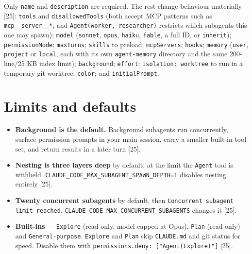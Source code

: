 \documentclass[11pt,a4paper,twoside,openany]{book}
\begin{document}
Only \texttt{name} and \texttt{description} are required. The rest change behaviour materially [25]: \texttt{tools} and \texttt{disallowed\allowbreak{}Tools} (both accept MCP patterns such as \texttt{mcp\_\allowbreak{}\_\allowbreak{}server\_\allowbreak{}\_\allowbreak{}*}, and \texttt{Agent(worke\allowbreak{}r,\allowbreak{} researcher\allowbreak{})} restricts which subagents this one may spawn); \texttt{model} (\texttt{sonnet}, \texttt{opus}, \texttt{haiku}, \texttt{fable}, a full ID, or \texttt{inherit}); \texttt{permission\allowbreak{}Mode}; \texttt{max\allowbreak{}Turns}; \texttt{skills} to preload; \texttt{mcp\allowbreak{}Servers}; \texttt{hooks}; \texttt{memory} (\texttt{user}, \texttt{project} or \texttt{local}, each with its own \texttt{agent-\allowbreak{}memory} directory and the same 200-line/25 KB index limit); \texttt{background}; \texttt{effort}; \texttt{isolation:\allowbreak{} worktree} to run in a temporary git worktree; \texttt{color}; and \texttt{initial\allowbreak{}Prompt}.


\FloatBarrier
\setcounter{section}{4}
\section{Limits and defaults}

\begin{itemize}
\item \textbf{Background is the default.} Background subagents run concurrently, surface permission prompts in your main session, carry a smaller built-in tool set, and return results in a later turn [25].
\item \textbf{Nesting is three layers deep} by default; at the limit the \texttt{Agent} tool is withheld. \texttt{CLAUDE\_\allowbreak{}CODE\_\allowbreak{}MAX\_\allowbreak{}SUBAGENT\_\allowbreak{}SPAWN\_\allowbreak{}DEPTH=\allowbreak{}1} disables nesting entirely [25].
\item \textbf{Twenty concurrent subagents} by default, then \texttt{Concurrent \allowbreak{}subagent li\allowbreak{}mit reached}. \texttt{CLAUDE\_\allowbreak{}CODE\_\allowbreak{}MAX\_\allowbreak{}CONCURRENT\_\allowbreak{}SUBAGENTS} changes it [25].
\item \textbf{Built-ins} — \texttt{Explore} (read-only, model capped at Opus), \texttt{Plan} (read-only) and \texttt{General-\allowbreak{}purpose}. \texttt{Explore} and \texttt{Plan} skip \texttt{CLAUDE.\allowbreak{}md} and git status for speed. Disable them with \texttt{permissions.\allowbreak{}deny:\allowbreak{} ["Agent(Ex\allowbreak{}plore)"]} [25].
\end{itemize}
\end{document}
